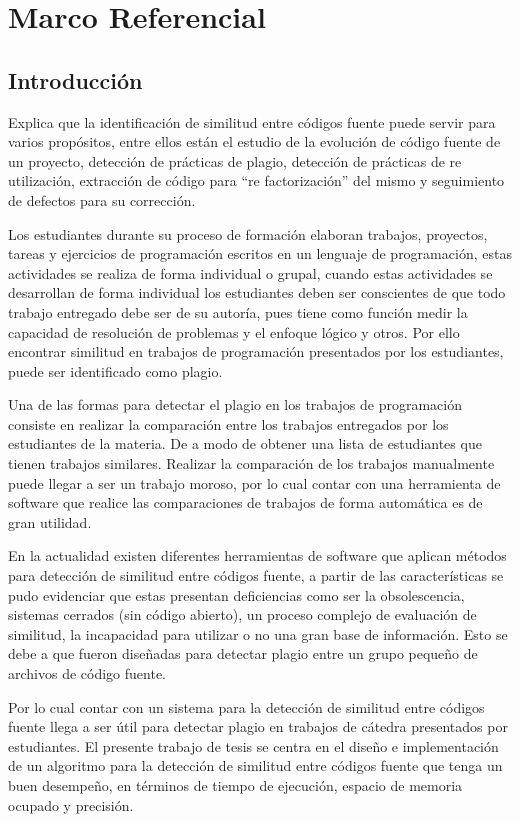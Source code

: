 \chapter{Marco Referencial}

\section{Introducción}
\cite{unknown1} Explica que la identificación de similitud entre códigos fuente puede servir para varios propósitos, entre ellos están el estudio de la evolución de código fuente de un proyecto, detección de prácticas de plagio, detección de prácticas de re utilización, extracción de código para “re factorización” del mismo y seguimiento de defectos para su corrección.

Los estudiantes durante su proceso de formación elaboran trabajos, proyectos, tareas y ejercicios de programación escritos en un lenguaje de programación, estas actividades se realiza de forma individual o grupal, cuando estas actividades se desarrollan de forma individual los estudiantes deben ser conscientes de que todo trabajo entregado debe ser de su autoría, pues tiene como función medir la capacidad de resolución de problemas y el enfoque lógico y otros. Por ello encontrar similitud en trabajos de programación presentados por los estudiantes, puede ser identificado como plagio.

Una de las formas para detectar el plagio en los trabajos de programación consiste en realizar la comparación entre los trabajos entregados por los estudiantes de la materia. De a modo de obtener una lista de estudiantes que tienen trabajos similares. Realizar la comparación de los trabajos manualmente puede llegar a ser un trabajo moroso, por lo cual contar con una herramienta de software que realice las comparaciones de trabajos de forma automática es de gran utilidad.

En la actualidad existen diferentes herramientas de software que aplican métodos para detección de similitud entre códigos fuente, a partir de las características se pudo evidenciar que estas presentan deficiencias como ser la obsolescencia, sistemas cerrados (sin código abierto), un proceso complejo de evaluación de similitud, la incapacidad para utilizar o no una gran base de información. Esto se debe a que fueron diseñadas para detectar plagio entre un grupo pequeño de archivos de código fuente.

Por lo cual contar con un sistema para la detección de similitud entre códigos fuente llega a ser útil para detectar plagio en trabajos de cátedra presentados por estudiantes. El presente trabajo de tesis se centra en el diseño e implementación de un algoritmo para la detección de similitud entre códigos fuente que tenga un buen desempeño, en términos de tiempo de ejecución, espacio de memoria ocupado y precisión.
